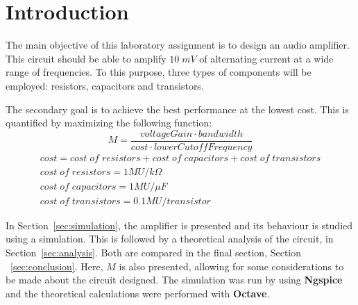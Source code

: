 \newpage

\section{Introduction}
\label{sec:introduction}


The main objective of this laboratory assignment is to design an audio amplifier. This circuit should be able to amplify $10\;mV$ of alternating current at a wide range of frequencies. To this purpose, three types of components will be employed: resistors, capacitors and transistors.

The secondary goal is to achieve the best performance at the lowest cost. This is quantified by maximizing the following function:
\begin{equation}
  M = \frac{voltageGain \cdot bandwidth}{cost \cdot lowerCutoffFrequency}
\end{equation}
\begin{gather*}
  cost = cost\;of\;resistors + cost\;of\;capacitors + cost\;of\;transistors \\
  cost\;of\;resistors = 1 MU/k\Omega \\
  cost\;of\;capacitors = 1 MU/\mu F \\
  cost\;of\;transistors = 0.1 MU/transistor
\end{gather*}

In Section~\ref{sec:simulation}, the amplifier is presented and its behaviour is studied using a simulation. This is followed by a theoretical analysis of the circuit, in Section~\ref{sec:analysis}. Both are compared in the final section, Section ~\ref{sec:conclusion}. Here, $M$ is also presented, allowing for some considerations to be made about the circuit designed. The simulation was run by using {\bf Ngspice} and the theoretical calculations were performed with {\bf Octave}.
